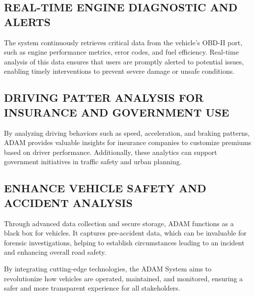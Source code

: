 \subsection{REAL-TIME ENGINE DIAGNOSTIC AND ALERTS}
The system continuously retrieves critical data from the vehicle's OBD-II port, such as engine performance metrics, error codes, and fuel efficiency. Real-time analysis of this data ensures that users are promptly alerted to potential issues, enabling timely interventions to prevent severe damage or unsafe conditions.

\subsection{DRIVING PATTER ANALYSIS FOR INSURANCE AND GOVERNMENT USE}
By analyzing driving behaviors such as speed, acceleration, and braking patterns, ADAM provides valuable insights for insurance companies to customize premiums based on driver performance. Additionally, these analytics can support government initiatives in traffic safety and urban planning.

\subsection{ENHANCE VEHICLE SAFETY AND ACCIDENT ANALYSIS}
Through advanced data collection and secure storage, ADAM functions as a black box for vehicles. It captures pre-accident data, which can be invaluable for forensic investigations, helping to establish circumstances leading to an incident and enhancing overall road safety.

By integrating cutting-edge technologies, the ADAM System aims to revolutionize how vehicles are operated, maintained, and monitored, ensuring a safer and more transparent experience for all stakeholders.

